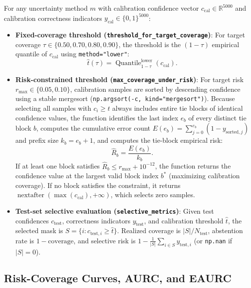 \documentclass[11pt,a4paper]{article}
\begin{document}
For any uncertainty method $m$ with calibration confidence vector $c_{\text{cal}} \in \mathbb{R}^{5000}$ and calibration correctness indicators $y_{\text{cal}} \in \{0, 1\}^{5000}$:
\begin{itemize}
  \item \textbf{Fixed-coverage threshold (\texttt{threshold\_\allowbreak{}for\_\allowbreak{}target\_\allowbreak{}coverage})}: For target coverage $\tau \in \{0.50, 0.70, 0.80, 0.90\}$, the threshold is the $(1 - \tau)$ empirical quantile of $c_{\text{cal}}$ using \texttt{method="lower"}:
  \begin{equation}
    \hat{t}(\tau) = \operatorname{Quantile}_{1-\tau}^{\text{lower}}(c_{\text{cal}}).
  \end{equation}
  \item \textbf{Risk-constrained threshold (\texttt{max\_\allowbreak{}coverage\_\allowbreak{}under\_\allowbreak{}risk})}: For target risk $r_{\max} \in \{0.05, 0.10\}$, calibration samples are sorted by descending confidence using a stable mergesort (\texttt{np.\allowbreak{}argsort(\allowbreak{}-c,\allowbreak{} kind="mergesort")}). Because selecting all samples with $c_i \ge t$ always includes entire tie blocks of identical confidence values, the function identifies the last index $e_b$ of every distinct tie block $b$, computes the cumulative error count $E(e_b) = \sum_{j=0}^{e_b} (1 - y_{\text{sorted},j})$ and prefix size $k_b = e_b + 1$, and computes the tie-block empirical risk:
  \begin{equation}
    \hat{R}_b = \frac{E(e_b)}{k_b}.
  \end{equation}
  If at least one block satisfies $\hat{R}_b \le r_{\max} + 10^{-12}$, the function returns the confidence value at the largest valid block index $b^*$ (maximizing calibration coverage). If no block satisfies the constraint, it returns $\operatorname{nextafter}(\max(c_{\text{cal}}), +\infty)$, which selects zero samples.
  \item \textbf{Test-set selective evaluation (\texttt{selective\_\allowbreak{}metrics})}: Given test confidences $c_{\text{test}}$, correctness indicators $y_{\text{test}}$, and calibration threshold $\hat{t}$, the selected mask is $S = \{i : c_{\text{test},i} \ge \hat{t}\}$. Realized coverage is $|S| / N_{\text{test}}$, abstention rate is $1 - \text{coverage}$, and selective risk is $1 - \frac{1}{|S|} \sum_{i \in S} y_{\text{test},i}$ (or \texttt{np.\allowbreak{}nan} if $|S| = 0$).
\end{itemize}

\subsection{Risk-Coverage Curves, AURC, and EAURC}
\end{document}
